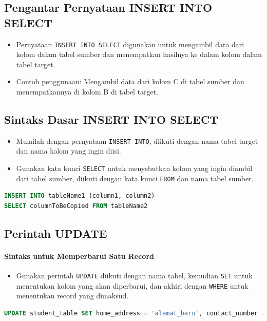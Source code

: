 \documentclass{article}
\begin{document}
\subsection{Pengantar Pernyataan INSERT INTO SELECT}
\begin{itemize}
    \item Pernyataan \texttt{INSERT INTO SELECT} digunakan untuk mengambil data dari kolom dalam tabel sumber dan menempatkan hasilnya ke dalam kolom dalam tabel target.
    \item Contoh penggunaan: Mengambil data dari kolom C di tabel sumber dan menempatkannya di kolom B di tabel target.
\end{itemize}

\subsection{Sintaks Dasar INSERT INTO SELECT}
\begin{itemize}
    \item Mulailah dengan pernyataan \texttt{INSERT INTO}, diikuti dengan nama tabel target dan nama kolom yang ingin diisi.
    \item Gunakan kata kunci \texttt{SELECT} untuk menyebutkan kolom yang ingin diambil dari tabel sumber, diikuti dengan kata kunci \texttt{FROM} dan nama tabel sumber.
\end{itemize}
\begin{lstlisting}[language=SQL, caption={Sintaks INSERT INTO SELECT}, captionpos=b]
INSERT INTO tableName1 (column1, column2) 
SELECT columnToBeCopied FROM tableName2
\end{lstlisting}

\subsection{Perintah UPDATE}
\paragraph{Sintaks untuk Memperbarui Satu Record}
\begin{itemize}
    \item Gunakan perintah \texttt{UPDATE} diikuti dengan nama tabel, kemudian \texttt{SET} untuk menentukan kolom yang akan diperbarui, dan akhiri dengan \texttt{WHERE} untuk menentukan record yang dimaksud.
\end{itemize}
\begin{lstlisting}[language=SQL, caption={Contoh UPDATE Satu Record}, captionpos=b]
UPDATE student_table SET home_address = 'alamat_baru', contact_number = 'nomor_baru' WHERE ID = 3;
\end{lstlisting}
\end{document}
